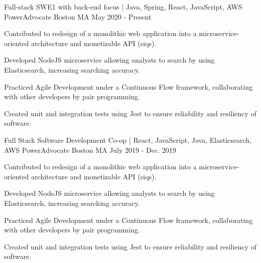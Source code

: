 
\begin{cventries}
\cventry
    {Full-stack SWE1 with back-end focus | Java, Spring, React, JavaScript, AWS} %
    {PowerAdvocate} %
    {Boston MA} %
    {May 2020 - Present} %
    {
      \begin{cvitems} %
        \item {Contributed to redesign of a monolithic web application into a microservice-oriented architecture and monetizable API (siqs).}
        \item {Developed NodeJS microservice allowing analysts to search by using Elasticsearch, increasing searching accuracy.}
        \item {Practiced Agile Development under a Continuous Flow framework, collaborating with other developers by pair programming.}
        \item {Created unit and integration tests using Jest to ensure reliability and resiliency of software.}
      \end{cvitems}
    }
\cventry
    {Full Stack Software Development Co-op | React, JavaScript, Java, Elasticsearch, AWS} %
    {PowerAdvocate} %
    {Boston MA} %
    {July 2019 - Dec. 2019} %
    {
      \begin{cvitems} %
        \item {Contributed to redesign of a monolithic web application into a microservice-oriented architecture and monetizable API (siqs).}
        \item {Developed NodeJS microservice allowing analysts to search by using Elasticsearch, increasing searching accuracy.}
        \item {Practiced Agile Development under a Continuous Flow framework, collaborating with other developers by pair programming.}
        \item {Created unit and integration tests using Jest to ensure reliability and resiliency of software.}
      \end{cvitems}
    }

\end{cventries}
